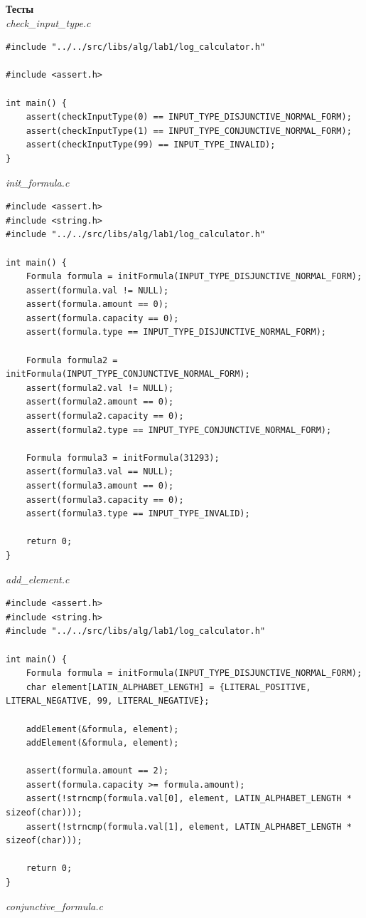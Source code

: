 \documentclass[a4paper,14pt]{extarticle}
\begin{document}
\newpage
\textbf{Тесты}\\
\textit{check\_input\_type.c}
\begin{verbatim}
#include "../../src/libs/alg/lab1/log_calculator.h"

#include <assert.h>

int main() {
    assert(checkInputType(0) == INPUT_TYPE_DISJUNCTIVE_NORMAL_FORM);
    assert(checkInputType(1) == INPUT_TYPE_CONJUNCTIVE_NORMAL_FORM);
    assert(checkInputType(99) == INPUT_TYPE_INVALID);
}
\end{verbatim}
\textit{init\_formula.c}
\begin{verbatim}
#include <assert.h>
#include <string.h>
#include "../../src/libs/alg/lab1/log_calculator.h"

int main() {
    Formula formula = initFormula(INPUT_TYPE_DISJUNCTIVE_NORMAL_FORM);
    assert(formula.val != NULL);
    assert(formula.amount == 0);
    assert(formula.capacity == 0);
    assert(formula.type == INPUT_TYPE_DISJUNCTIVE_NORMAL_FORM);

    Formula formula2 = initFormula(INPUT_TYPE_CONJUNCTIVE_NORMAL_FORM);
    assert(formula2.val != NULL);
    assert(formula2.amount == 0);
    assert(formula2.capacity == 0);
    assert(formula2.type == INPUT_TYPE_CONJUNCTIVE_NORMAL_FORM);

    Formula formula3 = initFormula(31293);
    assert(formula3.val == NULL);
    assert(formula3.amount == 0);
    assert(formula3.capacity == 0);
    assert(formula3.type == INPUT_TYPE_INVALID);

    return 0;
}
\end{verbatim}
\textit{add\_element.c}
\begin{verbatim}
#include <assert.h>
#include <string.h>
#include "../../src/libs/alg/lab1/log_calculator.h"

int main() {
    Formula formula = initFormula(INPUT_TYPE_DISJUNCTIVE_NORMAL_FORM);
    char element[LATIN_ALPHABET_LENGTH] = {LITERAL_POSITIVE, LITERAL_NEGATIVE, 99, LITERAL_NEGATIVE};

    addElement(&formula, element);
    addElement(&formula, element);

    assert(formula.amount == 2);
    assert(formula.capacity >= formula.amount);
    assert(!strncmp(formula.val[0], element, LATIN_ALPHABET_LENGTH * sizeof(char)));
    assert(!strncmp(formula.val[1], element, LATIN_ALPHABET_LENGTH * sizeof(char)));

    return 0;
}
\end{verbatim}
\textit{conjunctive\_formula.c}
\end{document}
